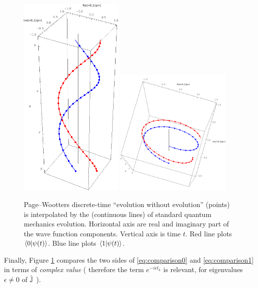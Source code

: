 \begin{figure}
  \centering
  \includegraphics[width=0.45\textwidth]{img/PWfit32.png}
  \includegraphics[width=0.5\textwidth]{img/PWfit32top.png}
  \caption[
    P-W vs Schr{\"o}dinger evolution (complex values)
  ]{
    Page--Wootters discrete-time ``evolution without evolution'' (points)
    is interpolated by the (continuous lines) of standard quantum mechanics
    evolution.
    Horizontal axis are real and imaginary part of the wave function components.
    Vertical axis is time $t$.
    Red   line plots {\color{red}   $\braket{0}{\psi(t)}$}.
    Blue  line plots {\color{blue}  $\braket{1}{\psi(t)}$}.
  }
  \label{fig:complex-comparison}
\end{figure}

Finally, Figure \ref{fig:complex-comparison} compares the two sides of
\eqref{eq:comparison0} and \eqref{eq:comparison1}
in terms of \emph{complex value}
(%
  therefore the term $e^{-i \epsilon t_k}$ is relevant,
  for eigenvalues $\epsilon \neq 0$ of $\hat{\mathbb{J}}$%
).
